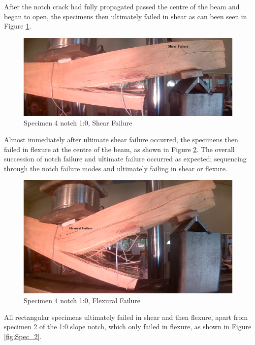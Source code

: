 \documentclass[11pt,a4paper]{article}
\numberwithin{equation}{subsection}
\begin{document}
\noindent
After the notch crack had fully propagated passed the centre of the beam and began to open, the specimens then ultimately failed in shear as can been seen in Figure \ref{fig:Rect_Shear}. 

\begin{figure}[h]
	\begin{center}
		\includegraphics[scale=0.31]{Rect_Shear}
	\end{center}
	\caption{Specimen 4 notch 1:0, Shear Failure}
	\label{fig:Rect_Shear}
\end{figure}

\noindent
Almost immediately after ultimate shear failure occurred, the specimens then failed in flexure at the centre of the beam, as shown in Figure \ref{fig:Rect_Flex}. The overall succession of notch failure and ultimate failure occurred as expected; sequencing through the notch failure modes and ultimately failing in shear or flexure. 

\begin{figure}[h]
	\begin{center}
		\includegraphics[scale=0.3]{Rect_Flexure}
	\end{center}
	\caption{Specimen 4 notch 1:0, Flexural Failure}
	\label{fig:Rect_Flex}
\end{figure}
\pagebreak

\noindent
All rectangular specimens ultimately failed in shear and then flexure, apart from specimen 2 of the 1:0 slope notch, which only failed in flexure, as shown in Figure \ref{fig:Spec_2}.
\end{document}
